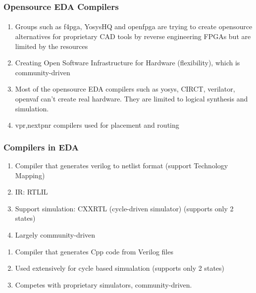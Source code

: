 \documentclass{beamer}
\begin{document}
\begin{frame}[fragile]
  \frametitle{Opensource EDA Compilers}
  \framesubtitle{}
  \begin{enumerate}
    \item Groups such as f4pga, YosysHQ and openfpga are trying to create opensource
      alternatives for proprietary CAD tools by reverse engineering FPGAs
      but are limited by the resources 
    \item Creating Open Software Infrastructure for Hardware (flexibility),
      which is community-driven 
    \item Most of the opensource EDA compilers such as yosys, CIRCT, verilator,
      openvaf can't create real hardware. They are limited to
      logical synthesis and simulation.
     \item vpr\cite{vpr2},nextpnr\cite{nextpnr1} compilers used for placement and routing  
  \end{enumerate}
\end{frame}


\begin{frame}[fragile]
    \frametitle{Compilers in EDA}
        \begin{enumerate}
            \item Compiler that generates  verilog to netlist format (support Technology Mapping)
            \item IR: RTLIL
            \item Support simulation: CXXRTL (cycle-driven simulator) (supports
              only 2 states)
            \item Largely community-driven
        \end{enumerate}
        \begin{enumerate}
            \item Compiler that generates Cpp code from Verilog files
            \item Used extensively for cycle based simualation (supports only 2 states)
            \item Competes with proprietary simulators, community-driven.
        \end{enumerate}
    
\end{frame}
\end{document}

